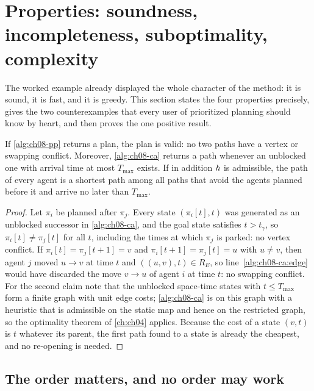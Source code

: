 \section[Properties]{Properties: soundness, incompleteness, suboptimality, complexity}
\label{sec:ch08-properties}

The worked example already displayed the whole character of the method: it is sound,
it is fast, and it is greedy. This section states the four properties precisely, gives
the two counterexamples that every user of prioritized planning should know by heart,
and then proves the one positive result.

\begin{proposition}
\label{thm:ch08-sound}
If \cref{alg:ch08-pp} returns a plan, the plan is valid: no two paths have a vertex or
swapping conflict. Moreover, \cref{alg:ch08-ca} returns a path whenever an unblocked one with arrival
time at most $T_{\max}$ exists. If in addition $h$ is admissible, the path of
every agent is a shortest path among all paths that avoid the agents planned before it and arrive
no later than $T_{\max}$.
\end{proposition}
\begin{proof}
Let $\pi_i$ be planned after $\pi_j$. Every state $(\pi_i[t], t)$ was generated as an
unblocked successor in \cref{alg:ch08-ca}, and the goal state satisfies $t > t_\gamma$, so
$\pi_i[t] \ne \pi_j[t]$ for all $t$, including the times at which $\pi_j$ is parked:
no vertex conflict. If $\pi_i[t] = \pi_j[t+1] = v$ and $\pi_i[t+1] = \pi_j[t] = u$ with
$u \ne v$, then agent $j$ moved $u \to v$ at time $t$ and $((u, v), t) \in R_E$, so
line~\ref{alg:ch08-ca:edge} would have discarded the move $v \to u$ of agent $i$ at
time $t$: no swapping conflict. For the second claim note that the unblocked
space-time states with $t \le T_{\max}$ form a finite graph with unit edge costs;
\cref{alg:ch08-ca} is \astar on this graph with a heuristic that is admissible on the
static map and hence on the restricted graph, so the optimality theorem of
\cref{ch:ch04} applies. Because the cost of a state $(v, t)$ is $t$ whatever its parent,
the first path found to a state is already the cheapest, and no re-opening is needed.
\end{proof}

\subsection{The order matters, and no order may work}

